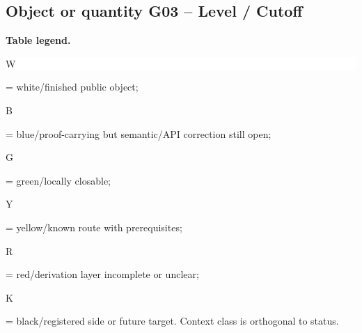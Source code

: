 \subsection*{Object or quantity G03 -- Level /\allowbreak{} Cutoff}
\hypertarget{objproof:G03}{}
\par\smallskip\noindent\begin{minipage}{0.99\linewidth}\footnotesize\raggedright\textbf{Table legend.} \colorbox{white}{\strut W} = white/finished public object; \colorbox{cyan!20}{\strut B} = blue/proof-carrying but semantic/API correction still open; \colorbox{green!18}{\strut G} = green/locally closable; \colorbox{yellow!25}{\strut Y} = yellow/known route with prerequisites; \colorbox{red!20}{\strut R} = red/derivation layer incomplete or unclear; \colorbox{black!18}{\strut K} = black/registered side or future target. Context class is orthogonal to status.\end{minipage}\par\vspace{0.25em}
